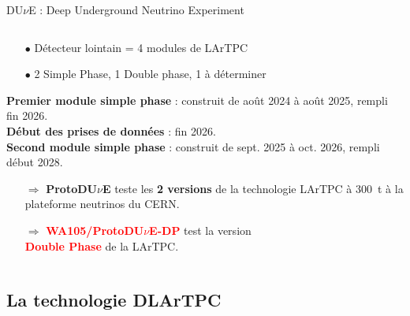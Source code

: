 \begin{frame}{DU$\nu$E : Deep Underground Neutrino Experiment}
\begin{scriptsize}
\begin{columns}
\begin{column}{0.45\textwidth}
                    \begin{itemize}
                        \item[$\bullet$] Détecteur lointain = 4 modules de LArTPC
                        \item[$\bullet$] 2 Simple Phase, 1 Double phase, 1 à déterminer
                    \end{itemize}
                    \textbf{Premier module simple phase} : construit de août 2024 à août 2025, rempli fin 2026.\\
                    \textbf{Début des prises de données} : fin 2026.\\
                    \textbf{Second module simple phase} : construit de sept. 2025 à oct. 2026, rempli début 2028.\\
                    \begin{itemize}
                        \item[$\Rightarrow$] \textbf{ProtoDU$\nu$E} teste les \textbf{2 versions} de la technologie LArTPC  à \SI{300}{\tonne} à la plateforme neutrinos du CERN.\\
                        \item[$\Rightarrow$]\textcolor{red}{\textbf{WA105/ProtoDU$\nu$E-DP}} test la version\\ \textcolor{red}{\textbf{Double Phase}} de la LArTPC.\\
                    \end{itemize}
                \end{column}
            \end{columns}
        \end{scriptsize}
    \end{frame}


    \subsection[DLArTPC]{La technologie DLArTPC}

  {
    	\setlength\pdfpagewidth{12.8cm}%
    	\setlength\pdfpageheight{9.15cm}%
    	\begin{frame}[plain]
    	\end{frame}
    }


